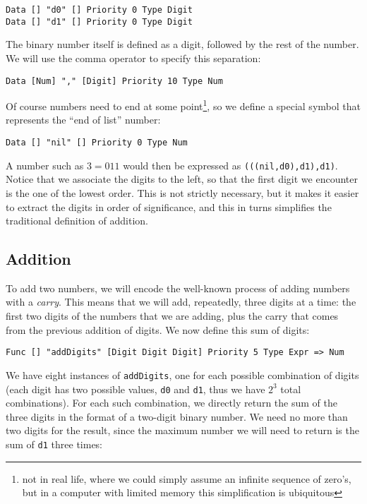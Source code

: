 \begin{lstlisting}
Data [] "d0" [] Priority 0 Type Digit
Data [] "d1" [] Priority 0 Type Digit
\end{lstlisting}

The binary number itself is defined as a digit, followed by the rest of the number. We will use the comma operator to specify this separation:

\begin{lstlisting}
Data [Num] "," [Digit] Priority 10 Type Num
\end{lstlisting}

Of course numbers need to end at some point\footnote{not in real life, where we could simply assume an infinite sequence of zero's, but in a computer with limited memory this simplification is ubiquitous}, so we define a special symbol that represents the ``end of list'' number:

\begin{lstlisting}
Data [] "nil" [] Priority 0 Type Num
\end{lstlisting}

A number such as $3 = 011$ would then be expressed as \texttt{(((nil,d0),d1),d1)}. Notice that we associate the digits to the left, so that the first digit we encounter is the one of the lowest order. This is not strictly necessary, but it makes it easier to extract the digits in order of significance, and this in turns simplifies the traditional definition of addition.


\subsection{Addition}
To add two numbers, we will encode the well-known process of adding numbers with a \textit{carry}. This means that we will add, repeatedly, three digits at a time: the first two digits of the numbers that we are adding, plus the carry that comes from the previous addition of digits. We now define this sum of digits:

\begin{lstlisting}
Func [] "addDigits" [Digit Digit Digit] Priority 5 Type Expr => Num
\end{lstlisting}

We have eight instances of \texttt{addDigits}, one for each possible combination of digits (each digit has two possible values, \texttt{d0} and \texttt{d1}, thus we have $2^3$ total combinations). For each such combination, we directly return the sum of the three digits in the format of a two-digit binary number. We need no more than two digits for the result, since the maximum number we will need to return is the sum of \texttt{d1} three times:

